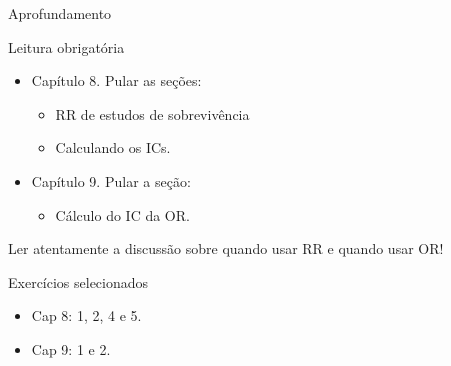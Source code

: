 \documentclass{beamer}
\begin{document}
\begin{frame}{Aprofundamento}
  \footnotesize
  \begin{block}{Leitura obrigatória}
    \begin{itemize}
    \item Capítulo 8. Pular as seções:
      \begin{itemize}
        \scriptsize
      \item RR de estudos de sobrevivência
      \item Calculando os ICs.
      \end{itemize}
    \item Capítulo 9. Pular a seção:
      \begin{itemize}
        \scriptsize
      \item Cálculo do IC da OR.
      \end{itemize}
    \end{itemize}
    \begin{block}{}
      Ler \alert{atentamente} a discussão sobre quando usar RR e quando usar OR!
    \end{block}
  \end{block}
  \begin{block}{Exercícios selecionados}
  \begin{itemize}
  \item Cap 8: 1, 2, 4 e 5.
  \item Cap 9: 1 e 2.
  \end{itemize}
  \end{block}
\end{frame}
\end{document}
